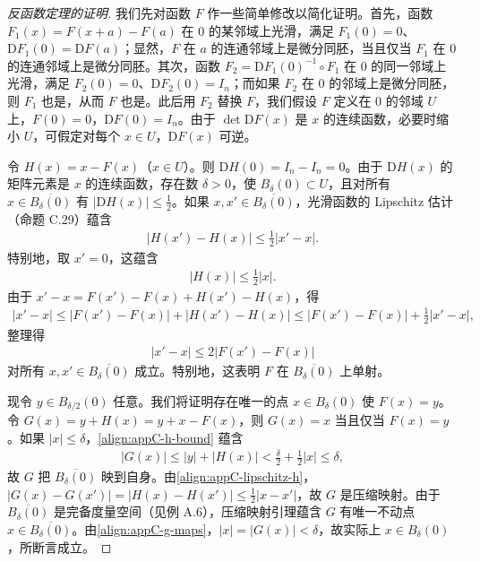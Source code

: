\documentclass[../../main.tex]{subfiles}
\begin{document}
\begin{proof}[反函数定理的证明]
我们先对函数 $F$ 作一些简单修改以简化证明。首先，函数 $F_1(x)=F(x+a)-F(a)$ 在 $0$ 的某邻域上光滑，满足 $F_1(0)=0$、$\mathrm{D}F_1(0)=\mathrm{D}F(a)$；显然，$F$ 在 $a$ 的连通邻域上是微分同胚，当且仅当 $F_1$ 在 $0$ 的连通邻域上是微分同胚。其次，函数 $F_2=\mathrm{D}F_1(0)^{-1}\circ F_1$ 在 $0$ 的同一邻域上光滑，满足 $F_2(0)=0$、$\mathrm{D}F_2(0)=I_n$；而如果 $F_2$ 在 $0$ 的邻域上是微分同胚，则 $F_1$ 也是，从而 $F$ 也是。此后用 $F_2$ 替换 $F$，我们假设 $F$ 定义在 $0$ 的邻域 $U$ 上，$F(0)=0$，$\mathrm{D}F(0)=I_n$。由于 $\det\mathrm{D}F(x)$ 是 $x$ 的连续函数，必要时缩小 $U$，可假定对每个 $x\in U$，$\mathrm{D}F(x)$ 可逆。

令 $H(x)=x-F(x)$（$x\in U$）。则 $\mathrm{D}H(0)=I_n-I_n=0$。由于 $\mathrm{D}H(x)$ 的矩阵元素是 $x$ 的连续函数，存在数 $\delta>0$，使 $B_\delta(0)\subset U$，且对所有 $x\in\overline{B_\delta(0)}$ 有 $|\mathrm{D}H(x)|\leqslant\frac12$。如果 $x,x'\in\overline{B_\delta(0)}$，光滑函数的 Lipschitz 估计（命题 C.29）蕴含
\begin{align}\label{align:appC-lipschitz-h}
|H(x')-H(x)|\leqslant\frac12|x'-x|.
\end{align}
特别地，取 $x'=0$，这蕴含
\begin{align}\label{align:appC-h-bound}
|H(x)|\leqslant\frac12|x|.
\end{align}
由于 $x'-x=F(x')-F(x)+H(x')-H(x)$，得
\begin{align*}
|x'-x|\leqslant|F(x')-F(x)|+|H(x')-H(x)|
\leqslant|F(x')-F(x)|+\frac12|x'-x|,
\end{align*}
整理得
\begin{align}\label{align:appC-injectivity}
|x'-x|\leqslant2|F(x')-F(x)|
\end{align}
对所有 $x,x'\in\overline{B_\delta(0)}$ 成立。特别地，这表明 $F$ 在 $\overline{B_\delta(0)}$ 上单射。

现令 $y\in B_{\delta/2}(0)$ 任意。我们将证明存在唯一的点 $x\in B_\delta(0)$ 使 $F(x)=y$。令 $G(x)=y+H(x)=y+x-F(x)$，则 $G(x)=x$ 当且仅当 $F(x)=y$。如果 $|x|\leqslant\delta$，\eqref{align:appC-h-bound} 蕴含
\begin{align}\label{align:appC-g-maps}
|G(x)|\leqslant|y|+|H(x)|<\frac{\delta}{2}+\frac12|x|\leqslant\delta,
\end{align}
故 $G$ 把 $\overline{B_\delta(0)}$ 映到自身。由\eqref{align:appC-lipschitz-h}，$|G(x)-G(x')|=|H(x)-H(x')|\leqslant\frac12|x-x'|$，故 $G$ 是压缩映射。由于 $\overline{B_\delta(0)}$ 是完备度量空间（见例 A.6），压缩映射引理蕴含 $G$ 有唯一不动点 $x\in\overline{B_\delta(0)}$。由\eqref{align:appC-g-maps}，$|x|=|G(x)|<\delta$，故实际上 $x\in B_\delta(0)$，所断言成立。


\end{proof}
\end{document}

